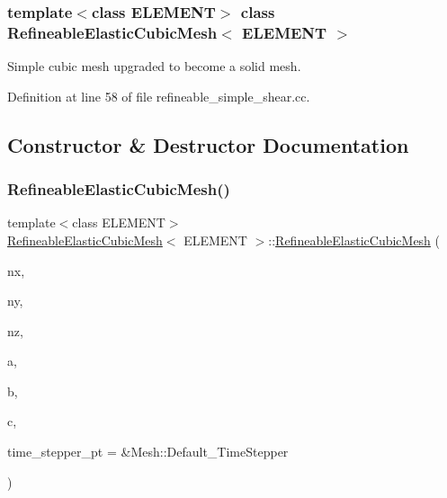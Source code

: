 \subsubsection*{template$<$class E\+L\+E\+M\+E\+NT$>$\newline
class Refineable\+Elastic\+Cubic\+Mesh$<$ E\+L\+E\+M\+E\+N\+T $>$}

Simple cubic mesh upgraded to become a solid mesh. 

Definition at line 58 of file refineable\+\_\+simple\+\_\+shear.\+cc.



\subsection{Constructor \& Destructor Documentation}
\mbox{\label{classRefineableElasticCubicMesh_a99c44a869363c33ed969a94256522b8c}} 
\subsubsection{\texorpdfstring{Refineable\+Elastic\+Cubic\+Mesh()}{RefineableElasticCubicMesh()}}
{\footnotesize\ttfamily template$<$class E\+L\+E\+M\+E\+NT$>$ \\
\hyperlink{classRefineableElasticCubicMesh}{Refineable\+Elastic\+Cubic\+Mesh}$<$ E\+L\+E\+M\+E\+NT $>$\+::\hyperlink{classRefineableElasticCubicMesh}{Refineable\+Elastic\+Cubic\+Mesh} (\begin{DoxyParamCaption}\item[{const unsigned \&}]{nx,  }\item[{const unsigned \&}]{ny,  }\item[{const unsigned \&}]{nz,  }\item[{const double \&}]{a,  }\item[{const double \&}]{b,  }\item[{const double \&}]{c,  }\item[{Time\+Stepper $\ast$}]{time\+\_\+stepper\+\_\+pt = {\ttfamily \&Mesh\+:\+:Default\+\_\+TimeStepper} }\end{DoxyParamCaption})\hspace{0.3cm}{\ttfamily [inline]}}



